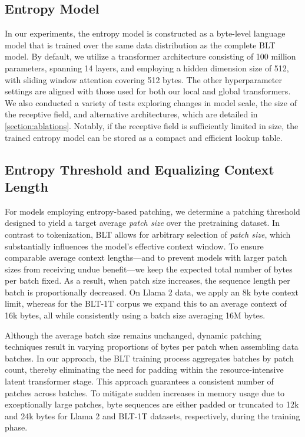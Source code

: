 \subsection{Entropy Model} In our experiments, the entropy model is constructed as a byte-level language model that is trained over the same data distribution as the complete {\textsc BLT} model. By default, we utilize a transformer architecture consisting of 100 million parameters, spanning 14 layers, and employing a hidden dimension size of 512, with sliding window attention covering 512 bytes. The other hyperparameter settings are aligned with those used for both our local and global transformers. We also conducted a variety of tests exploring changes in model scale, the size of the receptive field, and alternative architectures, which are detailed in \autoref{section:ablations}. Notably, if the receptive field is sufficiently limited in size, the trained entropy model can be stored as a compact and efficient lookup table.

\subsection{Entropy Threshold and Equalizing Context Length} For models employing entropy-based patching, we determine a patching threshold designed to yield a target average \textit{patch size} over the pretraining dataset. In contrast to tokenization, {\textsc BLT} allows for arbitrary selection of \textit{patch size}, which substantially influences the model's effective context window. To ensure comparable average context lengths—and to prevent models with larger patch sizes from receiving undue benefit—we keep the expected total number of bytes per batch fixed. As a result, when patch size increases, the sequence length per batch is proportionally decreased. On Llama 2 data, we apply an 8k byte context limit, whereas for the {\textsc BLT}-1T corpus we expand this to an average context of 16k bytes, all while consistently using a batch size averaging 16M bytes.

Although the average batch size remains unchanged, dynamic patching techniques result in varying proportions of bytes per patch when assembling data batches. In our approach, the {\textsc BLT} training process aggregates batches by patch count, thereby eliminating the need for padding within the resource-intensive latent transformer stage. This approach guarantees a consistent number of patches across batches. To mitigate sudden increases in memory usage due to exceptionally large patches, byte sequences are either padded or truncated to 12k and 24k bytes for Llama 2 and {\textsc BLT}-1T datasets, respectively, during the training phase.

